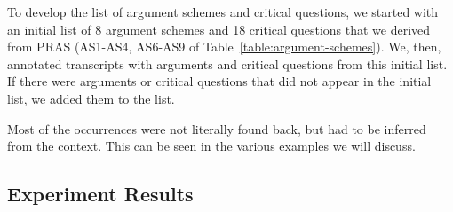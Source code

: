 To develop the list of argument schemes and critical questions, we started with an initial list of 8 argument schemes and 18 critical questions that we derived from PRAS (AS1-AS4, AS6-AS9 of Table~\ref{table:argument-schemes}). We, then, annotated transcripts with arguments and critical questions from this initial list. If there were arguments or critical questions that did not appear in the initial list, we added them to the list.

Most of the occurrences were not literally found back, but had to be inferred from the context. This can be seen in the various examples we will discuss.


\subsection{Experiment Results}

